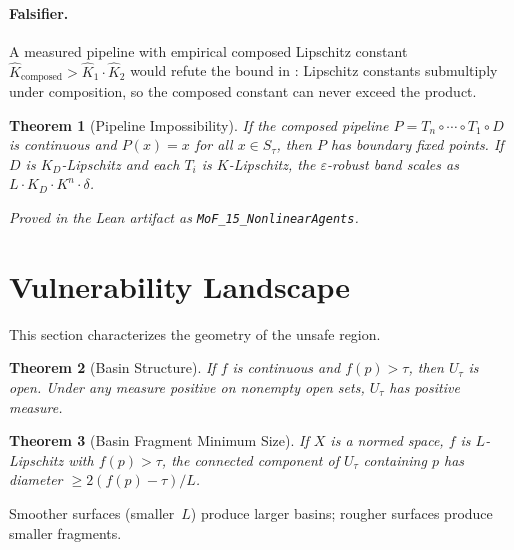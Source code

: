 \documentclass[11pt]{article}
\newtheorem{theorem}{Theorem}[section]
\begin{document}
\paragraph{Falsifier.}
A measured pipeline with empirical composed Lipschitz constant
$\hat K_{\text{composed}} > \hat K_1 \cdot \hat K_2$ would refute the
bound in : Lipschitz constants submultiply under
composition, so the composed constant can never exceed the product.

\begin{theorem}[Pipeline Impossibility]
\label{thm:pipeline-impossible}
If the composed pipeline $P = T_n \circ \cdots \circ T_1 \circ D$ is
continuous and $P(x) = x$ for all $x \in S_\tau$, then $P$ has
boundary fixed points. If $D$ is $K_D$-Lipschitz and each $T_i$ is
$K$-Lipschitz, the $\varepsilon$-robust band scales as
$L \cdot K_D \cdot K^n \cdot \delta$.
\end{theorem}

\noindent\emph{Proved in the Lean artifact as
\textup{\texttt{MoF\_15\_NonlinearAgents}}.}

\begin{table}[h]
\centering
\small
\caption{Empirical pipeline Lipschitz degradation. The measured
composed constant $\hat K_{\text{composed}}$ is bounded above by
$\prod \hat K_i$, consistent with .}
\label{tab:pipeline}

\end{table}

\section{Vulnerability Landscape}
\label{app:landscape}

This section characterizes the geometry of the unsafe region.

\begin{theorem}[Basin Structure]
\label{thm:basin}
If $f$ is continuous and $f(p)>\tau$, then $U_\tau$ is open. Under
any measure positive on nonempty open sets, $U_\tau$ has positive
measure.
\end{theorem}

\begin{theorem}[Basin Fragment Minimum Size]
\label{thm:fragment}
If $X$ is a normed space, $f$ is $L$-Lipschitz with $f(p) > \tau$,
the connected component of $U_\tau$ containing $p$ has diameter
$\geq 2(f(p) - \tau)/L$.
\end{theorem}

Smoother surfaces (smaller~$L$) produce larger basins; rougher
surfaces produce smaller fragments.
\end{document}

